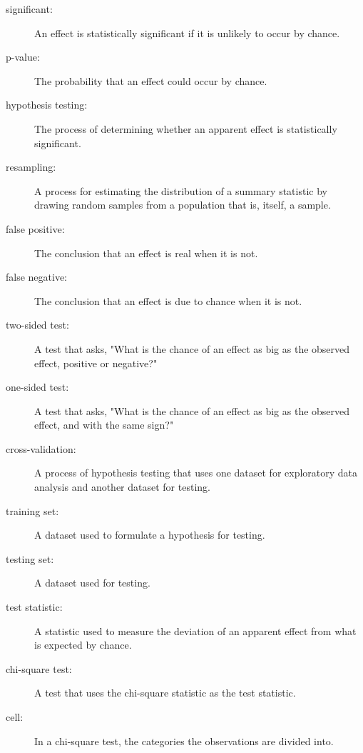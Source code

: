 \documentclass[12pt]{book}
\begin{document}
\begin{description}

\item[significant:] An effect is statistically significant if it is unlikely
to occur by chance.

\item[p-value:] The probability that an effect could occur by chance.

\item[hypothesis testing:] The process of determining whether an apparent
effect is statistically significant.

\item[resampling:] A process for estimating the distribution of a summary
statistic by drawing random samples from a population that is, itself, a
sample.

\item[false positive:] The conclusion that an effect is real when it is not.

\item[false negative:] The conclusion that an effect is due to chance when it
is not.

\item[two-sided test:] A test that asks, "What is the chance of an effect
as big as the observed effect, positive or negative?"

\item[one-sided test:] A test that asks, "What is the chance of an effect
as big as the observed effect, and with the same sign?"

\item[cross-validation:] A process of hypothesis testing that uses one
dataset for exploratory data analysis and another dataset for testing.

\item[training set:] A dataset used to formulate a hypothesis for testing.

\item[testing set:] A dataset used for testing.

\item[test statistic:] A statistic used to measure the deviation of an
apparent effect from what is expected by chance.

\item[chi-square test:] A test that uses the chi-square statistic as
the test statistic.

\item[cell:] In a chi-square test, the categories the observations are
divided into.

\end{description}
\end{document}
